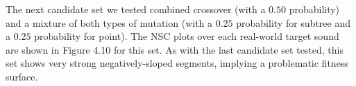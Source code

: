 \documentclass[a4paper,12pt]{report} 	%
\numberwithin{figure}{chapter}
\numberwithin{table}{chapter}
\numberwithin{equation}{chapter}
\begin{document}
\begin{flushleft}
The next candidate set we tested combined crossover (with a $0.50$ probability) and a mixture of both types of mutation (with a $0.25$ probability for subtree and a $0.25$ probability for point). The NSC plots over each real-world target sound are shown in Figure 4.10 for this set.
As with the last candidate set tested, this set shows very strong negatively-sloped segments, implying a problematic fitness surface.


\end{flushleft}
\end{document}
